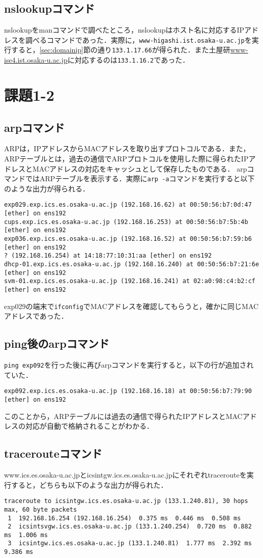 \documentclass[a4j,10pt,titlepage]{jsarticle}
\begin{document}
\subsection{nslookupコマンド}\label{sec:nslookup}
nslookupをmanコマンドで調べたところ，nslookupはホスト名に対応するIPアドレスを調べるコマンドであった．実際に，\verb|www-higashi.ist.osaka-u.ac.jp|を実行すると，\ref{sec:domainip}節の通り\verb|133.1.17.66|が得られた．また土屋研\url{www-ise4.ist.osaka-u.ac.jp}に対応するのは\verb|133.1.16.2|であった．

\section{課題1-2}
\subsection{arpコマンド}
ARPは，IPアドレスからMACアドレスを取り出すプロトコルである．また，ARPテーブルとは，過去の通信でARPプロトコルを使用した際に得られたIPアドレスとMACアドレスの対応をキャッシュとして保存したものである．
arpコマンドではARPテーブルを表示する．実際に\verb|arp -a|コマンドを実行すると以下のような出力が得られる．
\begin{verbatim}
exp029.exp.ics.es.osaka-u.ac.jp (192.168.16.62) at 00:50:56:b7:0d:47 [ether] on ens192
cups.exp.ics.es.osaka-u.ac.jp (192.168.16.253) at 00:50:56:b7:5b:4b [ether] on ens192
exp036.exp.ics.es.osaka-u.ac.jp (192.168.16.52) at 00:50:56:b7:59:b6 [ether] on ens192
? (192.168.16.254) at 14:18:77:10:31:aa [ether] on ens192
dhcp-01.exp.ics.es.osaka-u.ac.jp (192.168.16.240) at 00:50:56:b7:21:6e [ether] on ens192
svm-01.exp.ics.es.osaka-u.ac.jp (192.168.16.241) at 02:a0:98:c4:b2:cf [ether] on ens192
\end{verbatim}
exp029の端末で\verb|ifconfig|でMACアドレスを確認してもらうと，確かに同じMACアドレスであった．

\subsection{ping後のarpコマンド}
\verb|ping exp092|を行った後に再びarpコマンドを実行すると，以下の行が追加されていた．
\begin{verbatim}
exp092.exp.ics.es.osaka-u.ac.jp (192.168.16.18) at 00:50:56:b7:79:90 [ether] on ens192
\end{verbatim}
このことから，ARPテーブルには過去の通信で得られたIPアドレスとMACアドレスの対応が自動で格納されることがわかる．

\subsection{tracerouteコマンド}
www.ics.es.osaka-u.ac.jpとicsintgw.ics.es.osaka-u.ac.jpにそれぞれtracerouteを実行すると，どちらも以下のような出力が得られた．
\begin{verbatim}
traceroute to icsintgw.ics.es.osaka-u.ac.jp (133.1.240.81), 30 hops max, 60 byte packets
 1  192.168.16.254 (192.168.16.254)  0.375 ms  0.446 ms  0.508 ms
 2  icsintsvgw.ics.es.osaka-u.ac.jp (133.1.240.254)  0.720 ms  0.882 ms  1.006 ms
 3  icsintgw.ics.es.osaka-u.ac.jp (133.1.240.81)  1.777 ms  2.392 ms  9.386 ms
\end{verbatim}
\end{document}
